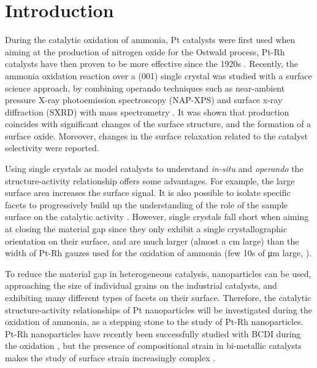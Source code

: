 \section{Introduction}

During the catalytic oxidation of ammonia, Pt catalysts were first used when aiming at the production of nitrogen oxide for the Ostwald process, Pt-Rh catalysts have then proven to be more effective since the 1920s \parencite{Handforth1934, Heck1982}.
Recently, the ammonia oxidation reaction over a (001) single crystal was studied with a surface science approach, by combining operando techniques such as near-ambient pressure X-ray photoemission spectroscopy (NAP-XPS) and surface x-ray diffraction (SXRD) with mass spectrometry \parencite{Resta2020a}.
It was shown that  production coincides with significant changes of the surface structure, and the formation of a  surface oxide.
Moreover, changes in the surface relaxation related to the catalyst selectivity were reported.

Using single crystals as model catalysts to understand \textit{in-situ} and \textit{operando} the structure-activity relationship offers some advantages.
For example, the large surface area increases the surface signal.
It is also possible to isolate specific facets to progressively build up the understanding of the role of the sample surface on the catalytic activity \parencite{Hejral2016, Resta2020a}.
However, single crystals fall short when aiming at closing the material gap since they only exhibit a single crystallographic orientation on their surface, and are much larger (almost a \unit{cm} large) than the width of Pt-Rh gauzes used for the oxidation of ammonia (few 10s of \unit{\micro\meter} large, \cite{Kaiser1909}).

To reduce the material gap in heterogeneous catalysis, nanoparticles can be used, approaching the size of individual grains on the industrial catalysts, and exhibiting many different types of facets on their surface.
Therefore, the catalytic structure-activity relationships of Pt nanoparticles will be investigated during the oxidation of ammonia, as a stepping stone to the study of Pt-Rh nanoparticles.
Pt-Rh nanoparticles have recently been successfully studied with BCDI during the  oxidation \parencite{Kim2021}, but the presence of compositional strain in bi-metallic catalysts makes the study of surface strain increasingly complex \parencite{Kawaguchi2019}.


